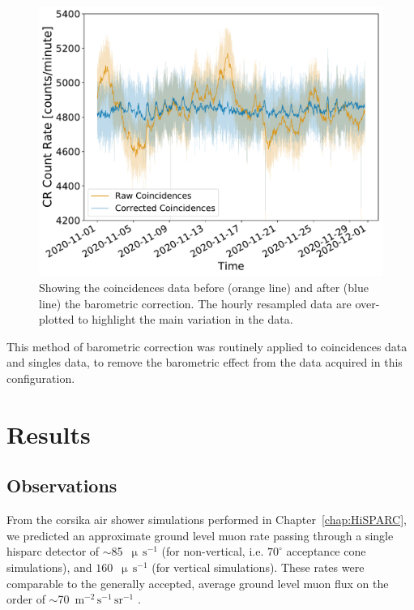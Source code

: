 \begin{figure}[htbp!]
	\centering
	\includegraphics[width=0.7\columnwidth]{raw_vs_corrected_coincidences.pdf}
	\caption{Showing the coincidences data before (orange line) and after (blue line) the barometric correction. The hourly resampled data are over-plotted to highlight the main variation in the data.}
	\label{fig:HS_14008_corrected_coincidences}
\end{figure}


This method of barometric correction was routinely applied to coincidences data and singles data, to remove the barometric effect from the data acquired in this configuration. %



\section{Results}\label{sec:HS_14008_results}

\subsection{Observations}\label{sec:HS_14008_observations}

From the \gls{corsika} air shower simulations performed in Chapter~\ref{chap:HiSPARC}, we predicted an approximate ground level muon rate passing through a single \gls{hisparc} detector of $\sim$85~$\upmu \, \mathrm{s}^{-1}$ (for non-vertical, i.e. $70^\circ$ acceptance cone simulations), and $160$~$\upmu \, \mathrm{s}^{-1}$ (for vertical simulations). These rates were comparable to the generally accepted, average ground level muon flux on the order of $\sim$70~$\mathrm{m}^{-2}\,\mathrm{s}^{-1}\,\mathrm{sr}^{-1}$ \citep{cecchini_cosmic_2000, blackmore_terrestrial_2015, pereira_ground-level_2021, particle_data_group_review_2020}.

